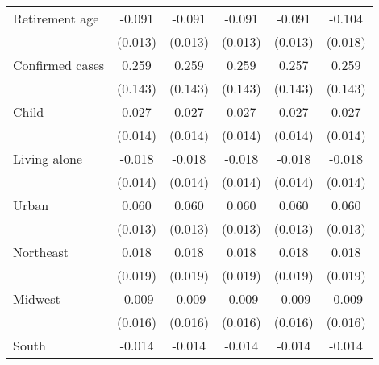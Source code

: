 {\begin{tabular}{l*{5}{c}}
\addlinespace
Retirement age      &      -0.091\sym{***}&      -0.091\sym{***}&      -0.091\sym{***}&      -0.091\sym{***}&      -0.104\sym{***}\\
                    &     (0.013)         &     (0.013)         &     (0.013)         &     (0.013)         &     (0.018)         \\
\addlinespace
Confirmed cases     &       0.259\sym{*}  &       0.259\sym{*}  &       0.259\sym{*}  &       0.257\sym{*}  &       0.259\sym{*}  \\
                    &     (0.143)         &     (0.143)         &     (0.143)         &     (0.143)         &     (0.143)         \\
\addlinespace
Child               &       0.027\sym{**} &       0.027\sym{**} &       0.027\sym{**} &       0.027\sym{*}  &       0.027\sym{**} \\
                    &     (0.014)         &     (0.014)         &     (0.014)         &     (0.014)         &     (0.014)         \\
\addlinespace
Living alone        &      -0.018         &      -0.018         &      -0.018         &      -0.018         &      -0.018         \\
                    &     (0.014)         &     (0.014)         &     (0.014)         &     (0.014)         &     (0.014)         \\
\addlinespace
Urban               &       0.060\sym{***}&       0.060\sym{***}&       0.060\sym{***}&       0.060\sym{***}&       0.060\sym{***}\\
                    &     (0.013)         &     (0.013)         &     (0.013)         &     (0.013)         &     (0.013)         \\
\addlinespace
Northeast           &       0.018         &       0.018         &       0.018         &       0.018         &       0.018         \\
                    &     (0.019)         &     (0.019)         &     (0.019)         &     (0.019)         &     (0.019)         \\
\addlinespace
Midwest             &      -0.009         &      -0.009         &      -0.009         &      -0.009         &      -0.009         \\
                    &     (0.016)         &     (0.016)         &     (0.016)         &     (0.016)         &     (0.016)         \\
\addlinespace
South               &      -0.014         &      -0.014         &      -0.014         &      -0.014         &      -0.014         \\

\end{tabular}}
